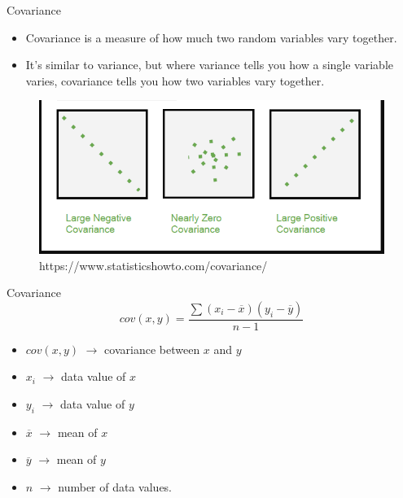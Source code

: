 \documentclass[10pt,dvipsnames, aspectratio=169]{beamer}
\begin{document}
\begin{frame}[t]{Covariance}
	\begin{itemize}
		\item Covariance is a measure of how much two random variables vary 
		together.
		\item 	It’s similar to variance, but where variance tells you how a 
		single variable varies, covariance tells you how two variables vary 
		together.
	\end{itemize}
	
	\begin{figure} [ht]
		\centering
		\includegraphics[trim={1cm 1cm 1cm 0}, clip, scale=0.4]{eda/cov.png}
		\caption{https://www.statisticshowto.com/covariance/}
	\end{figure}
	
\end{frame}
\begin{frame}[t]{Covariance}
	$$
	cov(x,y) = \frac{\sum{(x_i - \overline{x})(y_i - \overline{y})}}{n-1}	
	$$
	\begin{itemize}
		\item $cov(x,y)$ $\rightarrow$ covariance between $x$ and $y$
		\item $x_i$ $ \rightarrow$ data value of $x$
		\item $y_i$ $\rightarrow$ data value of $y$
		\item $\overline{x}$ $\rightarrow$  mean of $x$
		\item $\overline{y}$ $\rightarrow$ mean of $y$
		\item $n$ $\rightarrow$ number of data values. 
	\end{itemize}
	
	
\end{frame}
\end{document}
